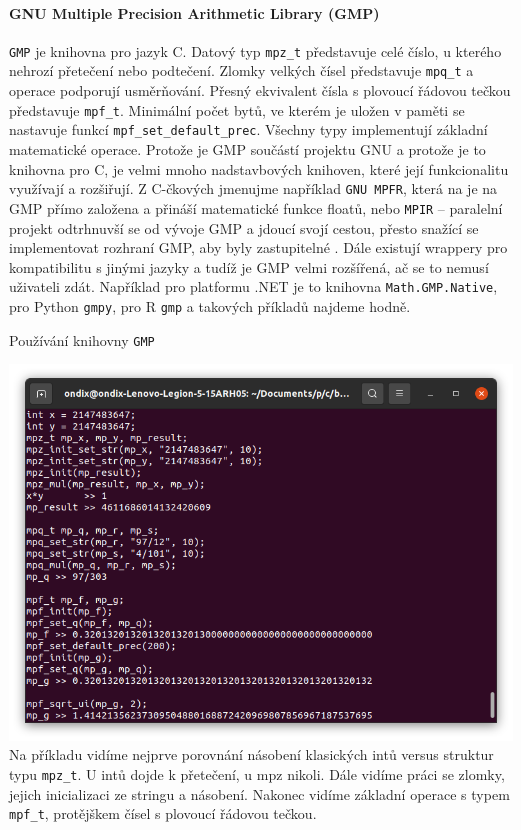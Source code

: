\paragraph{GNU Multiple Precision Arithmetic Library \cite{wiki:gmp} (GMP)}
\texttt{GMP} je knihovna pro jazyk C. Datový typ \texttt{mpz\_t} představuje celé číslo, u kterého nehrozí přetečení nebo podtečení. Zlomky velkých čísel představuje \texttt{mpq\_t} a operace podporují usměrňování. Přesný ekvivalent čísla s plovoucí řádovou tečkou představuje \texttt{mpf\_t}. Minimální počet bytů, ve kterém je uložen v paměti se nastavuje funkcí \texttt{mpf\_set\_default\_prec}. Všechny typy implementují základní matematické operace. Protože je GMP součástí projektu GNU a protože je to knihovna pro C, je velmi mnoho nadstavbových knihoven, které její funkcionalitu využívají a rozšiřují. Z C-čkových jmenujme například \texttt{GNU MPFR}, která na je na GMP přímo založena \cite{wiki:mpfr} a přináší matematické funkce floatů, nebo \texttt{MPIR} -- paralelní projekt odtrhnuvší se od vývoje GMP a jdoucí svojí cestou, přesto snažící se implementovat rozhraní GMP, aby byly zastupitelné \cite{wiki:mpir}. Dále existují wrappery pro kompatibilitu s jinými jazyky a tudíž je GMP velmi rozšířená, ač se to nemusí uživateli zdát. Například pro platformu .NET je to knihovna \texttt{Math.GMP.Native}, pro Python \texttt{gmpy}, pro R \texttt{gmp} a takových příkladů najdeme hodně.

\begin{myfigure}{}
\caption{Používání knihovny \texttt{GMP}}
\includegraphics[width=\linewidth]{./graphics/gmp.png}\label{obr:gmp}
Na příkladu vidíme nejprve porovnání násobení klasických intů versus struktur typu \texttt{mpz\_t}. U intů dojde k přetečení, u mpz nikoli. Dále vidíme práci se zlomky, jejich inicializaci ze stringu a násobení. Nakonec vidíme základní operace s typem \texttt{mpf\_t}, protějškem čísel s plovoucí řádovou tečkou.
\end{myfigure}

